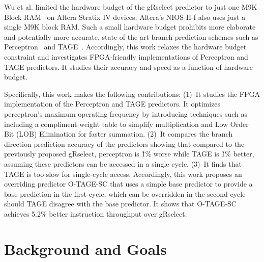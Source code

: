 \documentclass[conference]{IEEEtran}
\begin{document}
Wu et al. limited the hardware budget of the gRselect predictor to just one M9K Block RAM~\cite{StratixIVM9K} on Altera Stratix IV devices; Altera's NIOS II-f also uses just a single M9K block RAM. Such a small hardware budget prohibits more elaborate and potentially more accurate, state-of-the-art branch prediction schemes such as Perceptron~\cite{perceptron} and TAGE~\cite{tage}. Accordingly, this work relaxes the hardware budget constraint and investigates FPGA-friendly implementations of Perceptron and TAGE predictors. It studies their accuracy and speed as a function of hardware budget.  

Specifically, this work makes the following contributions: (1)~It studies the FPGA implementation of the Perceptron and TAGE predictors. It optimizes perceptron's maximum operating frequency by introducing techniques such as including a compliment weight table to simplify multiplication and Low Order Bit (LOB) Elimination for faster summation. (2)~It compares the branch direction prediction accuracy of the predictors showing that compared to the previously proposed gRselect, perceptron is \~1\% worse while TAGE is \~1\% better, assuming these predictors can be accessed in a single cycle. (3)~It finds that TAGE is too slow for single-cycle access. Accordingly, this work proposes an overriding predictor \mbox{O-TAGE-SC} that uses a simple base predictor to provide a base prediction in the first cycle, which can be overridden in the second cycle should TAGE disagree with the base predictor. It shows that \mbox{O-TAGE-SC} achieves 5.2\% better instruction throughput over gRselect.

\section{Background and Goals}
\label{sec:background}

\end{document}

